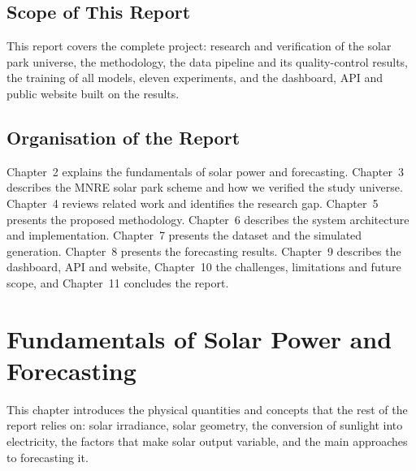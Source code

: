 \documentclass[12pt]{report}
\begin{document}
\section{Scope of This Report}
\vspace{1mm}
This report covers the complete project: research and verification of the solar park universe, the methodology, the data pipeline and its quality-control results, the training of all models, eleven experiments, and the dashboard, API and public website built on the results.

\section{Organisation of the Report}
\vspace{1mm}
Chapter~2 explains the fundamentals of solar power and forecasting. Chapter~3 describes the MNRE solar park scheme and how we verified the study universe. Chapter~4 reviews related work and identifies the research gap. Chapter~5 presents the proposed methodology. Chapter~6 describes the system architecture and implementation. Chapter~7 presents the dataset and the simulated generation. Chapter~8 presents the forecasting results. Chapter~9 describes the dashboard, API and website, Chapter~10 the challenges, limitations and future scope, and Chapter~11 concludes the report.

\chapter{Fundamentals of Solar Power and Forecasting}
This chapter introduces the physical quantities and concepts that the rest of the report relies on: solar irradiance, solar geometry, the conversion of sunlight into electricity, the factors that make solar output variable, and the main approaches to forecasting it.
\end{document}
